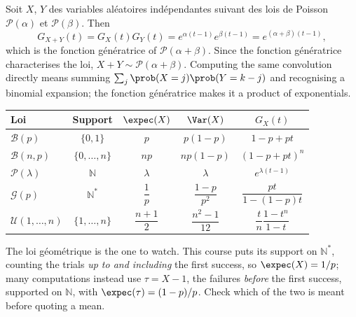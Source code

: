 \begin{example}
  Soit $X$, $Y$ des variables aléatoires indépendantes suivant des lois de
  Poisson $\mathcal{P}(\alpha)$ et $\mathcal{P}(\beta)$. Then
  \[ G_{X+Y}(t) = G_{X}(t)G_{Y}(t)
       = e^{\alpha(t-1)} e^{\beta(t-1)} = e^{(\alpha+\beta)(t-1)}, \]
  which is the fonction génératrice of $\mathcal{P}(\alpha+\beta)$. Since the
  fonction génératrice characterises the loi, $X + Y \sim
  \mathcal{P}(\alpha+\beta)$. Computing the same convolution directly means
  summing $\sum_{j} \prob(X=j)\prob(Y=k-j)$ and recognising a binomial
  expansion; the fonction génératrice makes it a product of exponentials.
\end{example}

\begin{center}
  \begin{tabular}{lcccc}
    \toprule
    Loi & Support & $\expec(X)$ & $\Var(X)$ & $G_{X}(t)$ \\
    \midrule
    $\mathcal{B}(p)$ & $\{0,1\}$ & $p$ & $p(1-p)$ & $1-p+pt$ \\[2pt]
    $\mathcal{B}(n,p)$ & $\{0,\dots,n\}$ & $np$ & $np(1-p)$ & $(1-p+pt)^{n}$ \\[2pt]
    $\mathcal{P}(\lambda)$ & $\mathbb{N}$ & $\lambda$ & $\lambda$ & $e^{\lambda(t-1)}$ \\[2pt]
    $\mathcal{G}(p)$ & $\mathbb{N}^{*}$ & $\dfrac{1}{p}$ & $\dfrac{1-p}{p^{2}}$ & $\dfrac{pt}{1-(1-p)t}$ \\[4pt]
    $\mathcal{U}(1,\dots,n)$ & $\{1,\dots,n\}$ & $\dfrac{n+1}{2}$ & $\dfrac{n^{2}-1}{12}$ & $\dfrac{t}{n}\dfrac{1-t^{n}}{1-t}$ \\
    \bottomrule
  \end{tabular}
\end{center}

\begin{remark}
  The loi géométrique is the one to watch. This course puts its support on
  $\mathbb{N}^{*}$, counting the trials \emph{up to and including} the first
  success, so $\expec(X) = 1/p$; many computations instead use $\tau = X - 1$, the
  failures \emph{before} the first success, supported on $\mathbb{N}$, with
  $\expec(\tau) = (1-p)/p$. Check which of the two is meant before quoting a mean.
\end{remark}

